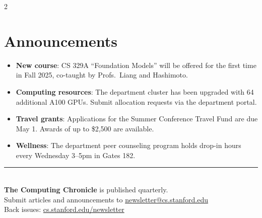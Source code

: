 \documentclass[10pt,a4paper]{article}
\begin{document}
\begin{multicols}{2}
\section{Announcements}

\begin{itemize}[leftmargin=1.2em, itemsep=4pt]
  \item \textbf{New course}: CS 329A ``Foundation Models'' will be offered for the first time in Fall 2025, co-taught by Profs.\ Liang and Hashimoto.
  \item \textbf{Computing resources}: The department cluster has been upgraded with 64 additional A100 GPUs. Submit allocation requests via the department portal.
  \item \textbf{Travel grants}: Applications for the Summer Conference Travel Fund are due May 1. Awards of up to \$2,500 are available.
  \item \textbf{Wellness}: The department peer counseling program holds drop-in hours every Wednesday 3--5pm in Gates 182.
\end{itemize}

\vspace{0.5cm}
\begin{center}
{\color{rulecolor}\rule{0.8\columnwidth}{0.5pt}}\\[6pt]
{\small\color{darktext}
\textbf{The Computing Chronicle} is published quarterly.\\
Submit articles and announcements to \href{mailto:newsletter@cs.stanford.edu}{newsletter@cs.stanford.edu}\\
Back issues: \href{https://cs.stanford.edu/newsletter}{cs.stanford.edu/newsletter}}
\end{center}

\end{multicols}
\end{document}
